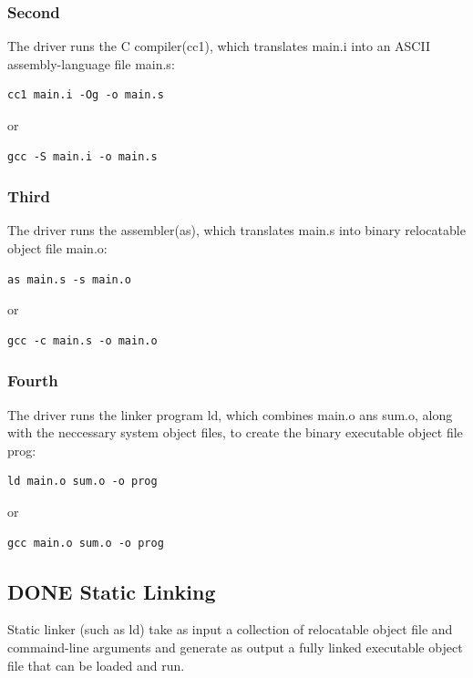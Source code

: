 \documentclass[11pt]{article}
\begin{document}
\subsubsection{Second}
\label{sec:org4e11c22}
The driver runs the C compiler(cc1), which translates main.i into an ASCII assembly-language file main.s:\\
\begin{verbatim}
cc1 main.i -Og -o main.s
\end{verbatim}
or\\
\begin{verbatim}
gcc -S main.i -o main.s
\end{verbatim}

\subsubsection{Third}
\label{sec:org7c0c9a0}
The driver runs the assembler(as), which translates main.s into binary relocatable object file main.o:\\
\begin{verbatim}
as main.s -s main.o
\end{verbatim}
or\\
\begin{verbatim}
gcc -c main.s -o main.o
\end{verbatim}

\subsubsection{Fourth}
\label{sec:org95592fc}
The driver runs the linker program ld, which combines main.o ans sum.o, along with the neccessary system object files, to create the binary executable object file prog:\\
\begin{verbatim}
ld main.o sum.o -o prog
\end{verbatim}

or\\
\begin{verbatim}
gcc main.o sum.o -o prog
\end{verbatim}

\subsection{{\bfseries\sffamily DONE} Static Linking}
\label{sec:org5304c00}
Static linker (such as ld) take as input a collection of relocatable object file and commaind-line arguments and generate as output a fully linked executable object file that can be loaded and run.\\
\end{document}
